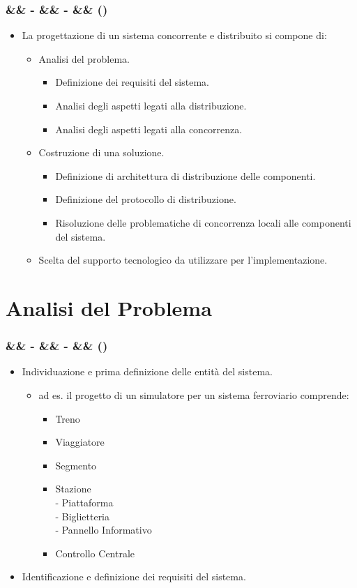 \documentclass[slidestop,compress,blackandwhite]{beamer}
\newcommand{\cm}[1]{\vspace{#1cm}}
\newcommand{\newtitle}[4]{
	#1 
	\ifx&#2&%
	\else
  		\large- #2
	\fi
	\ifx&#3&%
	\else
  		\normalsize- #3
	\fi
	\ifx&#4&%
	\else
  		\normalsize (#4)
	\fi
}
\newcommand{\newframe}[5]{
	\begin{frame}
		\frametitle{\newtitle{#1}{#2}{#3}{#4}}
		#5
	\end{frame}
}
\newcommand{\myitemize}[1]{
	\begin{itemize}\itemsep4pt
	#1
	\end{itemize}
}
\begin{document}
	\newframe{}{}{}{}{
		
		\myitemize {
			\item La progettazione di un sistema concorrente e distribuito si compone di:
				\cm{0.2}
				\myitemize {
					\item Analisi del problema.
						\myitemize {
							\item Definizione dei requisiti del sistema.
							\item Analisi degli aspetti legati alla distribuzione.
							\item Analisi degli aspetti legati alla concorrenza.
						}
					\item Costruzione di una soluzione.
						\myitemize {
							\item Definizione di architettura di distribuzione delle componenti.
							\item Definizione del protocollo di distribuzione.
							\item Risoluzione delle problematiche di concorrenza locali alle componenti del sistema.
						}
					\item Scelta del supporto tecnologico da utilizzare per l'implementazione.
				}
		}
	}

\section{Analisi del Problema}\label{analisis}
	\newframe{}{}{}{}{
		\myitemize {
			\item Individuazione e prima definizione delle entità del sistema.
				\myitemize {
					\item ad es. il progetto di un simulatore per un sistema ferroviario comprende:
						\myitemize{
							\item Treno
							\item Viaggiatore
							\item Segmento
							\item Stazione\\\cm{0.1}
								- Piattaforma\\ \cm{0.1}
								- Biglietteria\\ \cm{0.1}
								- Pannello Informativo
							\item Controllo Centrale
						}
				}
			\item Identificazione e definizione dei requisiti del sistema.
		}
	}
	
\end{document}
